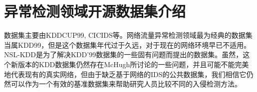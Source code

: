 













\section{异常检测领域开源数据集介绍}
数据集主要由KDDCUP99, CICIDS等。网络流量异常检测领域最为经典的数据集当属KDD99，但是这个数据集年代过于久远，对于现在的网络环境早已不适用。 NSL-KDD是为了解决KDD'99数据集的一些固有问题而提出的数据集。虽然，这个新版本的KDD数据集仍然存在McHugh所讨论的一些问题，并且可能不能完美地代表现有的真实网络，但由于缺乏基于网络的IDS的公共数据集，我们相信它仍然可以作为一个有效的基准数据集来帮助研究人员比较不同的入侵检测方法。

